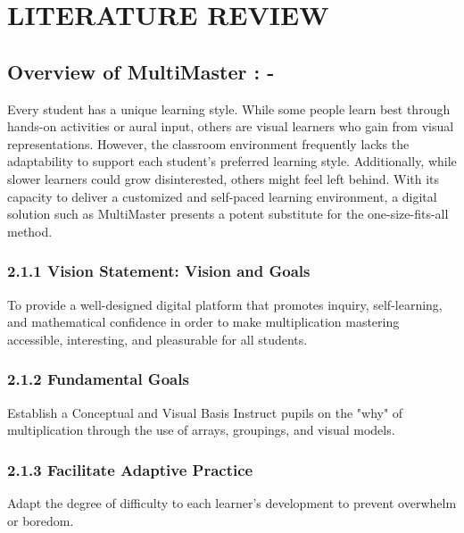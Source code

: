 \documentclass[BTech]{audiss}
\begin{document}
\newpage
\section{LITERATURE REVIEW}
\subsection{Overview of MultiMaster : -}
Every student has a unique learning style. While some people learn best through hands-on activities or aural input, others are visual learners who gain from visual representations. However, the classroom environment frequently lacks the adaptability to support each student's preferred learning style. Additionally, while slower learners could grow disinterested, others might feel left behind. With its capacity to deliver a customized and self-paced learning environment, a digital solution such as MultiMaster presents a potent substitute for the one-size-fits-all method.

\subsubsection{2.1.1 Vision Statement: Vision and Goals}
To provide a well-designed digital platform that promotes inquiry, self-learning, and mathematical confidence in order to make multiplication mastering accessible, interesting, and pleasurable for all students.

\subsubsection{2.1.2 Fundamental Goals}
Establish a Conceptual and Visual Basis Instruct pupils on the "why" of multiplication through the use of arrays, groupings, and visual models.

\subsubsection{2.1.3 Facilitate Adaptive Practice}
Adapt the degree of difficulty to each learner's development to prevent overwhelm or boredom.
\end{document}
